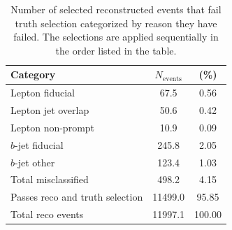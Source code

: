 \begin{table}
\begin{center}
\begin{tabular}{|l|cc|}
\hline
Category & $N_{\textrm{events}}$ & (\%) \\
\hline
Lepton fiducial & 67.5 & 0.56 \\
Lepton jet overlap & 50.6 & 0.42 \\
Lepton non-prompt & 10.9 & 0.09 \\
$b$-jet fiducial & 245.8 & 2.05 \\
$b$-jet other & 123.4 & 1.03 \\
\hline
Total misclassified & 498.2 & 4.15 \\
\hline \hline
Passes reco and truth selection & 11499.0 & 95.85 \\
\hline
Total reco events & 11997.1 & 100.00 \\
\hline
\end{tabular}
\end{center}
\caption{Number of selected reconstructed events that fail truth selection categorized by reason they have failed.  The selections are applied sequentially in the order listed in the table.}
\label{t:reconottruth}
\end{table}

